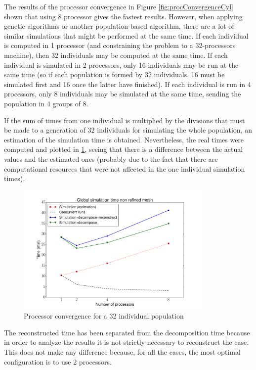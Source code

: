 \newpage

The results of the processor convergence in Figure \ref{fig:procConvergenceCyl} shown that using $8$ processor gives the fastest results. However, when applying genetic algorithms or another population-based algorithm, there are a lot of similar simulations that might be performed at the same time. If each individual is computed in 1 processor (and constraining the problem to a 32-processors machine), then 32 individuals may be computed at the same time. If each individual is simulated in 2 processors, only 16 individuals may be run at the same time (so if each population is formed by 32 individuals, 16 must be simulated first and 16 once the latter have finished). If each individual is run in 4 processors, only 8 individuals may be simulated at the same time, sending the population in 4 groups of 8. 


If the sum of times from one individual is multiplied by the divisions that must be made to a generation of $32$ individuals for simulating the whole population, an estimation of the simulation time is obtained. Nevertheless, the real times were computed and plotted in \ref{fig:genProcConvergenceCyl}, seeing that there is a difference between the actual values and the estimated ones (probably due to the fact that there are computational resources that were not affected in the one individual simulation times).  

     \begin{figure}[h!]
        \centering
        \includegraphics[width=0.85\textwidth]{Figures/3/procConv_1gen2.pdf}
        \caption{Processor convergence for a 32 individual population}
        \label{fig:genProcConvergenceCyl}
    \end{figure}

The reconstructed time has been separated from the decomposition time because in order to analyze the results it is not strictly necessary to reconstruct the case. This does not make any difference because, for all the cases, the most optimal configuration is to use 2 processors. 

